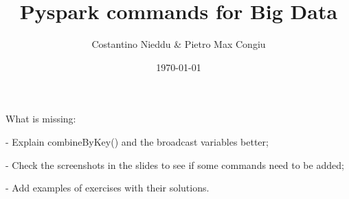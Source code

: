 \documentclass[12pt]{article}
\title{Pyspark commands for Big Data}
\author{Costantino Nieddu \& Pietro Max Congiu}
\date{\today}
\begin{document}
\maketitle


What is missing:

- Explain combineByKey() and the broadcast variables better;

- Check the screenshots in the slides to see if some commands need to be added;

- Add examples of exercises with their solutions.

\tableofcontents

\newpage













\newpage


\end{document}
